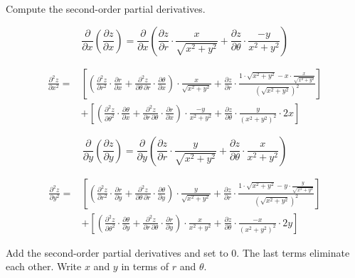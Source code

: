 \documentclass{article}
\begin{document}
\hfill

\noindent Compute the second-order partial derivatives.

\[\frac{\partial}{\partial x}\left(\frac{\partial z}{\partial x}\right)=\frac{\partial}{\partial x}\left(\frac{\partial z}{\partial r}\cdot\frac{x}{\sqrt{x^2+y^2}}+\frac{\partial z}{\partial\theta}\cdot\frac{-y}{x^2+y^2}\right)\]

\begin{align*}\frac{\partial^2z}{\partial x^2}=&\left[\left(\frac{\partial^2z}{\partial r^2}\cdot\frac{\partial r}{\partial x}+\frac{\partial^2 z}{\partial\theta\,\partial r}\cdot\frac{\partial\theta}{\partial x}\right)\cdot\frac{x}{\sqrt{x^2+y^2}}+\frac{\partial z}{\partial r}\cdot\frac{1\cdot\sqrt{x^2+y^2}-x\cdot\frac{x}{\sqrt{x^2+y^2}}}{\left(\sqrt{x^2+y^2}\right)^2}\right]\\&+\left[\left(\frac{\partial^2z}{\partial \theta^2}\cdot\frac{\partial \theta}{\partial x}+\frac{\partial^2 z}{\partial r\,\partial \theta}\cdot\frac{\partial r}{\partial x}\right)\cdot\frac{-y}{x^2+y^2}+\frac{\partial z}{\partial\theta}\cdot\frac{y}{(x^2+y^2)^2}\cdot2x\right]\end{align*}

\hfill

\[\frac{\partial}{\partial y}\left(\frac{\partial z}{\partial y}\right)=\frac{\partial}{\partial y}\left(\frac{\partial z}{\partial r}\cdot\frac{y}{\sqrt{x^2+y^2}}+\frac{\partial z}{\partial \theta}\cdot\frac{x}{x^2+y^2}\right)\]

\begin{align*}\frac{\partial^2z}{\partial y^2}=&\left[\left(\frac{\partial^2z}{\partial r^2}\cdot\frac{\partial r}{\partial y}+\frac{\partial^2 z}{\partial\theta\,\partial r}\cdot\frac{\partial\theta}{\partial y}\right)\cdot\frac{y}{\sqrt{x^2+y^2}}+\frac{\partial z}{\partial r}\cdot\frac{1\cdot\sqrt{x^2+y^2}-y\cdot\frac{y}{\sqrt{x^2+y^2}}}{\left(\sqrt{x^2+y^2}\right)^2}\right]\\&+\left[\left(\frac{\partial^2z}{\partial \theta^2}\cdot\frac{\partial \theta}{\partial y}+\frac{\partial^2 z}{\partial r\,\partial \theta}\cdot\frac{\partial r}{\partial y}\right)\cdot\frac{x}{x^2+y^2}+\frac{\partial z}{\partial\theta}\cdot\frac{-x}{(x^2+y^2)^2}\cdot2y\right]\end{align*}

\hfill

\noindent Add the second-order partial derivatives and set to $0$. The last terms eliminate each other. Write $x$ and $y$ in terms of $r$ and $\theta$.
\end{document}
